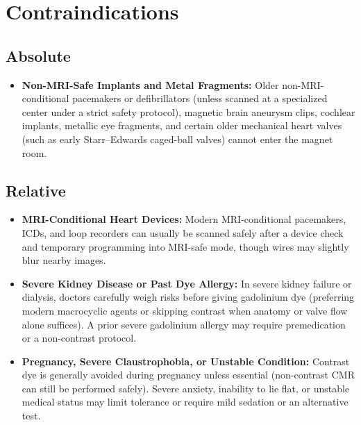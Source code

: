 \section{Contraindications}

\subsection{Absolute}
\begin{itemize}
\item \textbf{Non-MRI-Safe Implants and Metal Fragments:} Older non-MRI-conditional pacemakers or defibrillators (unless scanned at a specialized center under a strict safety protocol), magnetic brain aneurysm clips, cochlear implants, metallic eye fragments, and certain older mechanical heart valves (such as early Starr--Edwards caged-ball valves) cannot enter the magnet room.
\end{itemize}

\subsection{Relative}
\begin{itemize}
\item \textbf{MRI-Conditional Heart Devices:} Modern MRI-conditional pacemakers, ICDs, and loop recorders can usually be scanned safely after a device check and temporary programming into MRI-safe mode, though wires may slightly blur nearby images.
\item \textbf{Severe Kidney Disease or Past Dye Allergy:} In severe kidney failure or dialysis, doctors carefully weigh risks before giving gadolinium dye (preferring modern macrocyclic agents or skipping contrast when anatomy or valve flow alone suffices). A prior severe gadolinium allergy may require premedication or a non-contrast protocol.
\item \textbf{Pregnancy, Severe Claustrophobia, or Unstable Condition:} Contrast dye is generally avoided during pregnancy unless essential (non-contrast CMR can still be performed safely). Severe anxiety, inability to lie flat, or unstable medical status may limit tolerance or require mild sedation or an alternative test.
\end{itemize}

